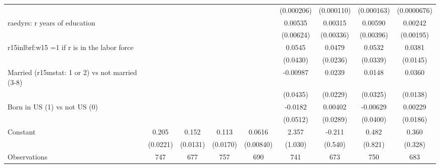 \begin{table}[htbp]
\begin{tabular}{l*{8}{c}}
                &                  &                  &                  &                  &(0.000206)         &(0.000110)         &(0.000163)         &(0.0000676)         \\
\addlinespace
raedyrs: r years of education&                  &                  &                  &                  &  0.00535         &  0.00315         &  0.00590         &  0.00242         \\
                &                  &                  &                  &                  &(0.00624)         &(0.00336)         &(0.00396)         &(0.00195)         \\
\addlinespace
r15inlbrf:w15 =1 if r is in the labor force&                  &                  &                  &                  &   0.0545         &   0.0479\sym{**} &   0.0532         &   0.0381\sym{***}\\
                &                  &                  &                  &                  & (0.0430)         & (0.0236)         & (0.0339)         & (0.0145)         \\
\addlinespace
Married (r15mstat: 1 or 2) vs not married (3-8)&                  &                  &                  &                  & -0.00987         &   0.0239         &   0.0148         &   0.0360\sym{***}\\
                &                  &                  &                  &                  & (0.0435)         & (0.0229)         & (0.0325)         & (0.0138)         \\
\addlinespace
Born in US (1) vs not US (0)&                  &                  &                  &                  &  -0.0182         &  0.00402         & -0.00629         &  0.00229         \\
                &                  &                  &                  &                  & (0.0512)         & (0.0289)         & (0.0400)         & (0.0186)         \\
\addlinespace
Constant        &    0.205\sym{***}&    0.152\sym{***}&    0.113\sym{***}&   0.0616\sym{***}&    2.357\sym{**} &   -0.211         &    0.482         &    0.360         \\
                & (0.0221)         & (0.0131)         & (0.0170)         &(0.00840)         &  (1.030)         &  (0.540)         &  (0.821)         &  (0.328)         \\
\midrule
Observations    &      747         &      677         &      757         &      690         &      741         &      673         &      750         &      683         \\

\end{tabular}
\end{table}
